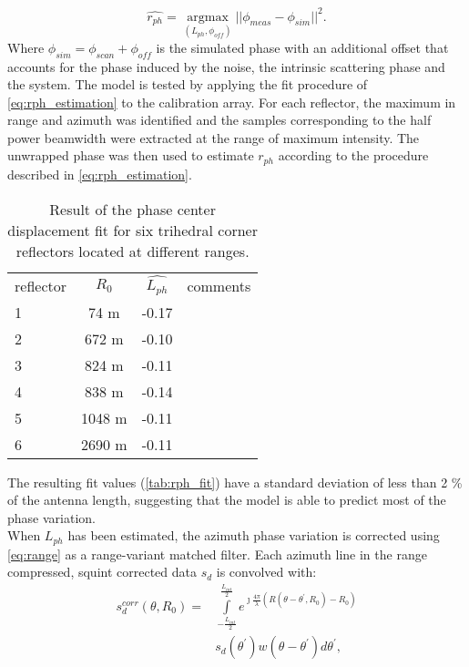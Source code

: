 \begin{equation}\label{eq:rph_estimation}
	\hat{r_{ph}} = \underset{\left(L_{ph}, \phi_{off}\right)}{\operatorname{argmax}}{\vert\vert\phi_{meas} - \phi_{sim}\vert\vert}^2.
\end{equation}
Where $\phi_{sim} = \phi_{scan} + \phi_{off}$ is the simulated phase with an additional offset that accounts for the phase induced by the noise, the intrinsic scattering phase and the system.
The model is tested by applying the fit procedure of \autoref{eq:rph_estimation} to the calibration array. For each reflector, the maximum in range and azimuth was identified and the samples corresponding to the half power beamwidth were extracted at the range of maximum intensity. The unwrapped phase was then used to estimate $r_{ph}$ according to the procedure described in \autoref{eq:rph_estimation}.
\begin{table}[ht]
	\begin{tabular}{lccl}
		\hline
		reflector & $R_0$ & $\hat{L_{ph}}$ & comments\\
		1	& 74 m & -0.17 & \\
		2  & 672 m & -0.10 & \\
		3 & 824 m & -0.11 & \\
		4 & 838 m & -0.14 &\\
		5 & 1048 m & -0.11&\\
		6 & 2690 m & -0.11&\\
		\hline
	\end{tabular}
	\caption{Result of the phase center displacement fit for six trihedral corner reflectors located at different ranges.}
	\label{tab:rph_fit}
\end{table}
The resulting fit values (\autoref{tab:rph_fit}) have a standard deviation of less than 2 \% of the antenna length, suggesting that the model is able to predict  most of the phase variation.\\
When $L_{ph}$ has been estimated, the azimuth phase variation is corrected using \autoref{eq:range} as a range-variant matched filter. Each azimuth line in the range compressed, squint corrected data $s_{d}$ is convolved with:
\begin{equation}\label{eq:correction}
	\begin{aligned}
		s_{d}^{corr}\left(\theta, R_{0}\right) = &\int\limits_{-\frac{L_{int}}{2}}^{\frac{L_{int}}{2}}e^{\jmath \frac{4\pi}{\lambda}\left(R\left(\theta - \theta^{\prime}, R_{0}\right) - R_{0}\right)}\\
		&s_{d}\left(\theta^\prime\right)w(\theta - \theta^{\prime}) d\theta^\prime,
	\end{aligned}
\end{equation}
